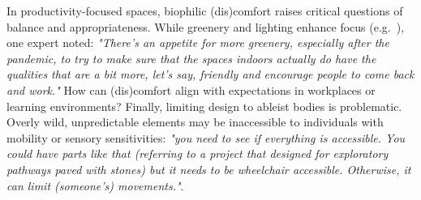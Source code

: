 In productivity-focused spaces, biophilic (dis)comfort raises critical questions of balance and appropriateness. While greenery and lighting enhance focus (e.g.~\cite{aries2005human}), one expert noted: \textit{"There's an appetite for more greenery, especially after the pandemic, to try to make sure that the spaces indoors actually do have the qualities that are a bit more, let's say, friendly and encourage people to come back and work."} How can (dis)comfort align with expectations in workplaces or learning environments? Finally, limiting design to ableist bodies is problematic. Overly wild, unpredictable elements may be inaccessible to individuals with mobility or sensory sensitivities: \textit{"you need to see if everything is accessible. You could have parts like that (referring to a project that designed for exploratory pathways paved with stones) but it needs to be wheelchair accessible. Otherwise, it can limit (someone's) movements."}.

\begingroup
\fontsize{7.3}{8.7}\selectfont
\setlength{\tabcolsep}{2.4pt}
\renewcommand{\arraystretch}{1.04}
\setlength{\LTleft}{0pt}
\setlength{\LTright}{0pt}

